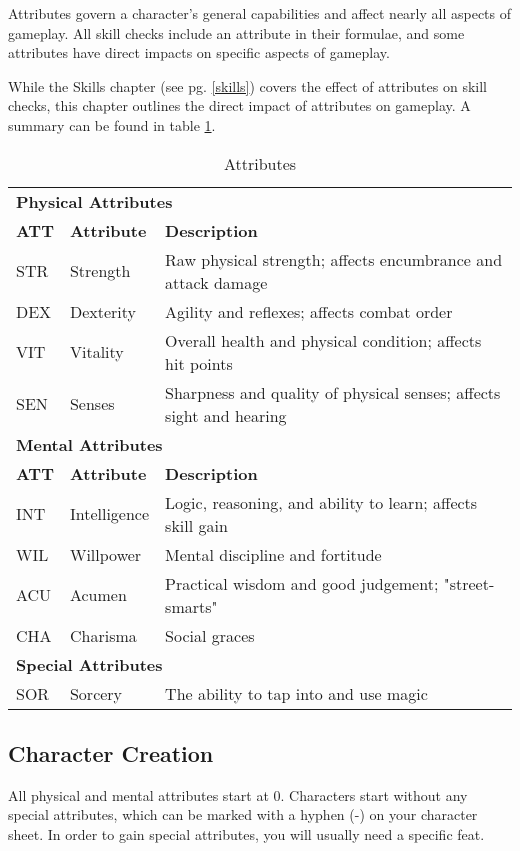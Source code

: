 Attributes govern a character's general capabilities and affect nearly all
aspects of gameplay. All skill checks include an attribute in their formulae,
and some attributes have direct impacts on specific aspects of gameplay.

While the Skills chapter (see pg. \ref{skills}) covers the effect of attributes
on skill checks, this chapter outlines the direct impact of attributes on
gameplay. A summary can be found in table \ref{tab:attributes}.

\begin{table}[h!]
    \begin{tabular}{l l l}
        \multicolumn{3}{l}{\textbf{Physical Attributes}} \\
        \textbf{ATT} & \textbf{Attribute} & \textbf{Description} \\
        STR & Strength & Raw physical strength; affects encumbrance and attack damage \\
        DEX & Dexterity & Agility and reflexes; affects combat order \\
        VIT & Vitality & Overall health and physical condition; affects hit points \\
        SEN & Senses & Sharpness and quality of physical senses; affects sight and hearing \\
        \multicolumn{3}{l}{\bfseries{Mental Attributes}} \\
        \textbf{ATT} & \textbf{Attribute} & \textbf{Description} \\
        INT & Intelligence & Logic, reasoning, and ability to learn; affects skill gain \\
        WIL & Willpower & Mental discipline and fortitude \\
        ACU & Acumen & Practical wisdom and good judgement; "street-smarts" \\
        CHA & Charisma & Social graces \\
        \multicolumn{3}{l}{\textbf{Special Attributes}} \\
        SOR & Sorcery & The ability to tap into and use magic \\
    \end{tabular}
    \caption{Attributes}
    \label{tab:attributes}
\end{table}

\subsection{Character Creation}
All physical and mental attributes start at 0. Characters start without any
special attributes, which can be marked with a hyphen (-) on your character
sheet. In order to gain special attributes, you will usually need a specific
feat.

